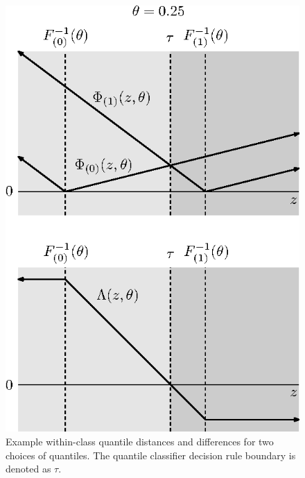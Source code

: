 \begin{figure}[ht]
  \caption[cccc]{Example within-class quantile distances and differences for two
    choices of quantiles.  The quantile classifier decision rule boundary is
    denoted as $\tau$.}
  \label{fig:phi-lambda}
  \vspace{5mm}
  
  \begin{minipage}[t]{0.49\linewidth}
    \centering
    \includegraphics{phi-lambda-0-25}
  \end{minipage}
  \begin{minipage}[t]{0.49\linewidth}
    \centering

\end{minipage}
\end{figure}
